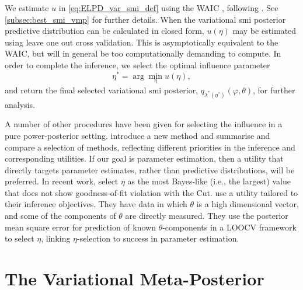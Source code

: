 We estimate $u$ in \cref{eq:ELPD_var_smi_def} using the WAIC \citep{Watanabe2012}, following \cite{Vehtari2016}. See \cref{subsec:best_smi_vmp} for further details.
When the variational \acrshort*{smi} posterior predictive distribution can be calculated in closed form, $u(\eta)$ may be estimated using leave one out cross validation.
This is asymptotically equivalent to the WAIC, but will in general be too computationally demanding to compute.
In order to complete the inference, we select the optimal influence parameter \begin{equation}\label{eqn:eta-star-defn}
  \eta^*=\arg\min_{\eta} u(\eta),
\end{equation}
and return the final selected variational \acrshort*{smi} posterior,
$q_{\lambda^*(\eta^*)}(\varphi,\theta)$, for further analysis.

A number of other procedures have been given for selecting the influence in a pure power-posterior setting. \cite{wu-martin-20,wu-martin-21} introduce a new method and summarise and compare a selection of methods, reflecting different priorities in the inference and corresponding utilities.
If our goal is parameter estimation, then a utility that directly targets parameter estimates, rather than predictive distributions, will be preferred.
In recent work, \cite{chakraborty22_smiLF} select $\eta$ as the most Bayes-like (i.e., the largest) value that does not show goodness-of-fit violation with the Cut.
\cite{Carmona2022spatial} use a utility tailored to their inference objectives.
They have data in which $\theta$ is a high dimensional vector, and some of the components of $\theta$ are directly measured.
They use the posterior mean square error for prediction of known $\theta$-components in a LOOCV framework to select $\eta$, linking $\eta$-selection to success in parameter estimation.

\section{The Variational Meta-Posterior}\label{sec:meta_posterior}

